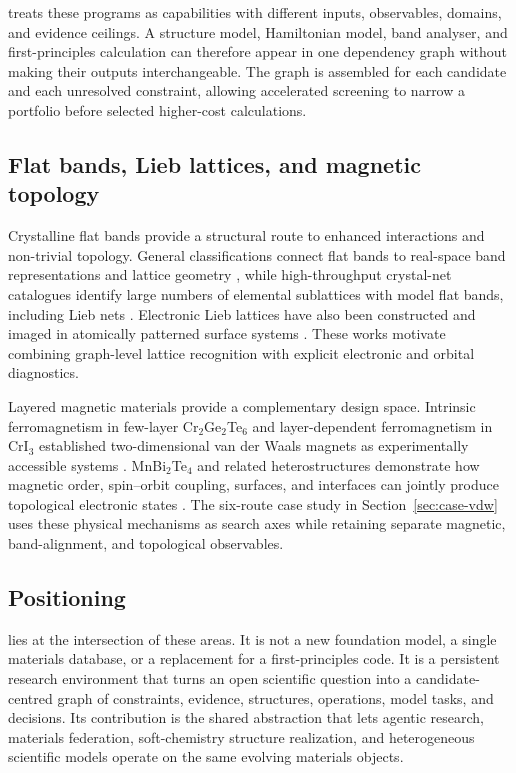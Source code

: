 \matdag treats these programs as capabilities with different inputs, observables, domains, and evidence ceilings.  A structure model, Hamiltonian model, band analyser, and first-principles calculation can therefore appear in one dependency graph without making their outputs interchangeable.  The graph is assembled for each candidate and each unresolved constraint, allowing accelerated screening to narrow a portfolio before selected higher-cost calculations.

\subsection{Flat bands, Lieb lattices, and magnetic topology}

Crystalline flat bands provide a structural route to enhanced interactions and non-trivial topology.  General classifications connect flat bands to real-space band representations and lattice geometry \cite{calugaru2022flatbands}, while high-throughput crystal-net catalogues identify large numbers of elemental sublattices with model flat bands, including Lieb nets \cite{neves2024crystalnets}.  Electronic Lieb lattices have also been constructed and imaged in atomically patterned surface systems \cite{drost2017lieb}.  These works motivate combining graph-level lattice recognition with explicit electronic and orbital diagnostics.

Layered magnetic materials provide a complementary design space.  Intrinsic ferromagnetism in few-layer Cr$_2$Ge$_2$Te$_6$ and layer-dependent ferromagnetism in CrI$_3$ established two-dimensional van der Waals magnets as experimentally accessible systems \cite{gong2017cgt,huang2017cri3}.  MnBi$_2$Te$_4$ and related heterostructures demonstrate how magnetic order, spin--orbit coupling, surfaces, and interfaces can jointly produce topological electronic states \cite{otrokov2019mnbi2te4,rienks2019hetero}.  The six-route case study in Section~\ref{sec:case-vdw} uses these physical mechanisms as search axes while retaining separate magnetic, band-alignment, and topological observables.

\subsection{Positioning}

\system lies at the intersection of these areas.  It is not a new foundation model, a single materials database, or a replacement for a first-principles code.  It is a persistent research environment that turns an open scientific question into a candidate-centred graph of constraints, evidence, structures, operations, model tasks, and decisions.  Its contribution is the shared abstraction that lets agentic research, materials federation, soft-chemistry structure realization, and heterogeneous scientific models operate on the same evolving materials objects.
